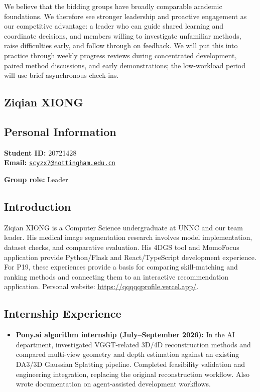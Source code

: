 \documentclass[a4paper,12pt]{article}
\newcommand{\PersonalInformation}[2]{%
  \subsection*{Personal Information}
  \if\relax\detokenize{#1}\relax\else
  \noindent\textbf{Student ID:} #1\\
  \fi
  \textbf{Email:} #2\par
}
\begin{document}
We believe that the bidding groups have broadly comparable academic foundations. We therefore see stronger leadership and proactive engagement as our competitive advantage: a leader who can guide shared learning and coordinate decisions, and members willing to investigate unfamiliar methods, raise difficulties early, and follow through on feedback. We will put this into practice through weekly progress reviews during concentrated development, paired method discussions, and early demonstrations; the low-workload period will use brief asynchronous check-ins.

\subsection{Ziqian XIONG}
\PersonalInformation{20721428}{\href{mailto:scyzx7@nottingham.edu.cn}{\nolinkurl{scyzx7@nottingham.edu.cn}}}
\noindent\textbf{Group role:} Leader\par

\subsection*{Introduction}
Ziqian XIONG is a Computer Science undergraduate at UNNC and our team leader. His medical image segmentation research involves model implementation, dataset checks, and comparative evaluation. His 4DGS tool and MomoFocus application provide Python/Flask and React/TypeScript development experience. For P19, these experiences provide a basis for comparing skill-matching and ranking methods and connecting them to an interactive recommendation application. Personal website: \url{https://qqqqqprofile.vercel.app/}.

\subsection*{Internship Experience}
\begin{itemize}
  \item \textbf{Pony.ai algorithm internship (July--September 2026):} In the AI department, investigated VGGT-related 3D/4D reconstruction methods and compared multi-view geometry and depth estimation against an existing DA3/3D Gaussian Splatting pipeline. Completed feasibility validation and engineering integration, replacing the original reconstruction workflow. Also wrote documentation on agent-assisted development workflows.
\end{itemize}
\end{document}
